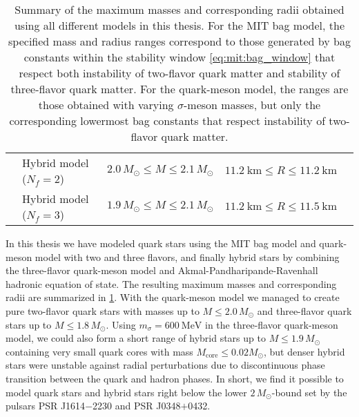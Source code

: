 \begin{table}
{\begin{tabular}{ l l c c c }
	\Cref{chap:hybrid} & Hybrid model ($N_f=2$) & $2.0 \, M_\odot \leq M \leq 2.1 \, M_\odot$ & $\SI{11.2}{\kilo\meter} \leq R \leq \SI{11.2}{\kilo\meter}$ \\
	\Cref{chap:hybrid} & Hybrid model ($N_f=3$) & $1.9 \, M_\odot \leq M \leq 2.1 \, M_\odot$ & $\SI{11.2}{\kilo\meter} \leq R \leq \SI{11.5}{\kilo\meter}$ \\
	\bottomrule
\end{tabular}}
\caption{\label{tab:master_conclusion:results}%
Summary of the maximum masses and corresponding radii obtained using all different models in this thesis.
For the MIT bag model, the specified mass and radius ranges correspond to those generated by bag constants within the stability window \eqref{eq:mit:bag_window}
that respect both instability of two-flavor quark matter and stability of three-flavor quark matter.
For the quark-meson model, the ranges are those obtained with varying $\sigma$-meson masses, but only the corresponding lowermost bag constants that respect instability of two-flavor quark matter.
}
\end{table}

In this thesis we have modeled quark stars using the MIT bag model and quark-meson model with two and three flavors,
and finally hybrid stars by combining the three-flavor quark-meson model and Akmal-Pandharipande-Ravenhall hadronic equation of state.
The resulting maximum masses and corresponding radii are summarized in \cref{tab:master_conclusion:results}.
With the quark-meson model we managed to create pure two-flavor quark stars with masses up to $M \leq 2.0 \, M_\odot$ and three-flavor quark stars up to $M \leq 1.8 \, M_\odot$.
Using $m_\sigma = \SI{600}{\mega\electronvolt}$ in the three-flavor quark-meson model,
we could also form a short range of hybrid stars up to $M \leq 1.9 \, M_\odot$ containing very small quark cores with mass $M_\text{core} \leq 0.02 M_\odot$,
but denser hybrid stars were unstable against radial perturbations due to discontinuous phase transition between the quark and hadron phases.
In short, we find it possible to model quark stars and hybrid stars right below the lower $2 \, M_\odot$-bound set by the pulsars PSR J1614$-$2230 and PSR J0348$+$0432.


